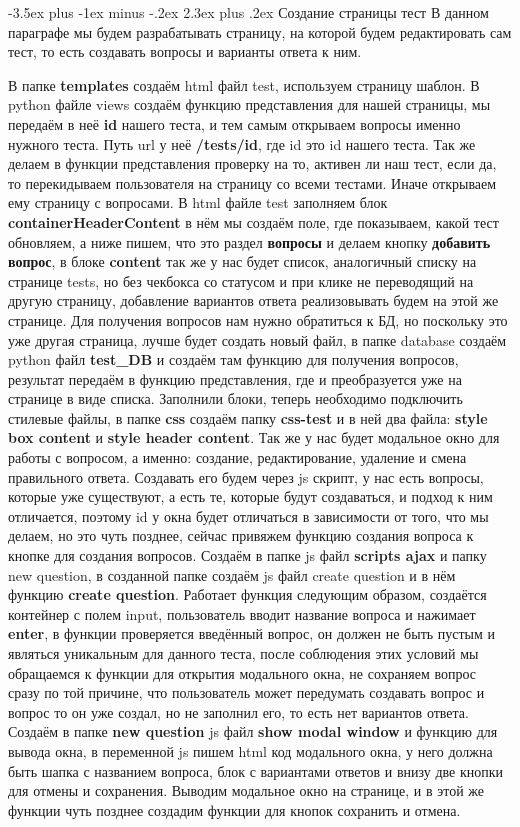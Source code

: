 \documentclass[12pt, oldlfont, amsfonts]{report}
\makeatletter
\renewcommand{\section}{\@startsection{section}{1}{0pt}%
                                {-3.5ex plus -1ex minus -.2ex}%
                                {2.3ex plus .2ex}%
{\centering\hyphenpenalty=10000\normalfont\Large\bfseries}}
\makeatother
\begin{document}
\section{Создание страницы тест}
В данном параграфе мы будем разрабатывать страницу, на которой будем редактировать сам тест, то есть создавать вопросы и варианты ответа к ним.

В папке {\bf templates} создаём html файл {test}, используем страницу шаблон. В python файле views создаём функцию представления для нашей страницы, мы передаём в неё {\bf id} нашего теста, и тем самым открываем вопросы именно нужного теста. Путь url у неё {\bf /tests/id}, где id это id нашего теста. Так же делаем в функции представления проверку на то, активен ли наш тест, если да, то перекидываем пользователя на страницу со всеми тестами. Иначе открываем ему страницу с вопросами. В html файле {test} заполняем блок {\bf containerHeaderContent} в нём мы создаём поле, где показываем, какой тест обновляем, а ниже пишем, что это раздел {\bf вопросы} и делаем кнопку {\bf добавить вопрос}, в блоке {\bf content} так же у нас будет список, аналогичный списку на странице tests, но без чекбокса со статусом и при клике не переводящий на другую страницу, добавление вариантов ответа реализовывать будем на этой же странице. Для получения вопросов нам нужно обратиться к БД, но поскольку это уже другая страница, лучше будет создать новый файл, в папке database создаём python файл {\bf test\_DB} и создаём там функцию для получения вопросов, результат передаём в функцию представления, где и преобразуется уже на странице в виде списка. Заполнили блоки, теперь необходимо подключить стилевые файлы, в папке {\bf css} создаём папку {\bf css-test} и в ней два файла: {\bf style box content} и {\bf style header content}.  Так же у нас будет модальное окно для работы с вопросом, а именно: создание, редактирование, удаление и смена правильного ответа. Создавать его будем через js скрипт, у нас есть вопросы, которые уже существуют, а есть те, которые будут создаваться, и подход к ним отличается, поэтому id у окна будет отличаться в зависимости от того, что мы делаем, но это чуть позднее, сейчас привяжем функцию создания вопроса к кнопке для создания вопросов. Создаём в папке js файл {\bf scripts ajax} и папку {new question}, в созданной папке создаём js файл {create question} и в нём функцию {\bf create question}. Работает функция следующим образом, создаётся контейнер с полем input, пользователь вводит название вопроса и нажимает {\bf enter}, в функции проверяется введённый вопрос, он должен не быть пустым и являться уникальным для данного теста, после соблюдения этих условий мы обращаемся к функции для открытия модального окна, не сохраняем вопрос сразу по той причине, что пользователь может передумать создавать вопрос и вопрос то он уже создал, но не заполнил его, то есть нет вариантов ответа. Создаём в папке {\bf new question} js файл {\bf show modal window} и функцию для вывода окна, в переменной js пишем html код модального окна, у него должна быть шапка с названием вопроса, блок с вариантами ответов и внизу две кнопки для отмены и сохранения. Выводим модальное окно на странице, и в этой же функции чуть позднее создадим функции для кнопок сохранить и отмена.
\end{document}
